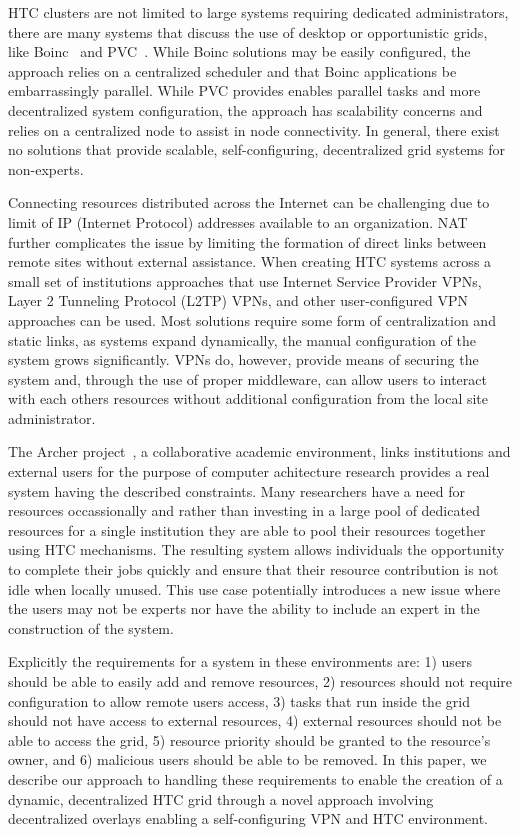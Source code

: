 \documentclass{sig-alternate}
\begin{document}
HTC clusters are not limited to large systems requiring dedicated
administrators, there are many systems that discuss the use of desktop or
opportunistic grids, like Boinc~\cite{boinc} and PVC~\cite{pvc}.  While Boinc
solutions may be easily configured, the approach relies on a centralized
scheduler and that Boinc applications be embarrassingly parallel.  While PVC
provides enables parallel tasks and more decentralized system configuration,
the approach has scalability concerns and relies on a centralized node to
assist in node connectivity.  In general, there exist no solutions that
provide scalable, self-configuring, decentralized grid systems for non-experts.

Connecting resources distributed across the Internet can be challenging due to
limit of IP (Internet Protocol) addresses available to an organization.  NAT
further complicates the issue by limiting the formation of direct links between
remote sites without external assistance.  When creating HTC systems across a
small set of institutions approaches that use Internet Service Provider VPNs,
Layer 2 Tunneling Protocol (L2TP) VPNs, and other user-configured VPN
approaches can be used.  Most solutions require some form of centralization
and static links, as systems expand dynamically, the manual configuration of
the system grows significantly.  VPNs do, however, provide means of securing
the system and, through the use of proper middleware, can allow users to
interact with each others resources without additional configuration from the
local site administrator.

The Archer project~\cite{archer}, a collaborative academic environment,
links institutions and external users for the purpose of computer achitecture
research provides a real system having the described constraints.  Many
researchers have a need for resources occassionally and rather than investing
in a large pool of dedicated resources for a single institution they are able
to pool their resources together using HTC mechanisms.  The resulting system
allows individuals the opportunity to complete their jobs quickly and ensure
that their resource contribution is not idle when locally unused.  This use
case potentially introduces a new issue where the users may not be experts nor
have the ability to include an expert in the construction of the system.

Explicitly the requirements for a system in these environments are: 1) users
should be able to easily add and remove resources, 2) resources should not
require configuration to allow remote users access, 3) tasks that run inside
the grid should not have access to external resources, 4) external resources
should not be able to access the grid, 5) resource priority should be granted
to the resource's owner, and 6) malicious users should be able to be removed.
In this paper, we describe our approach to handling these requirements to
enable the creation of a dynamic, decentralized HTC grid through a novel
approach involving decentralized overlays enabling a self-configuring VPN
and HTC environment.  
\end{document}
